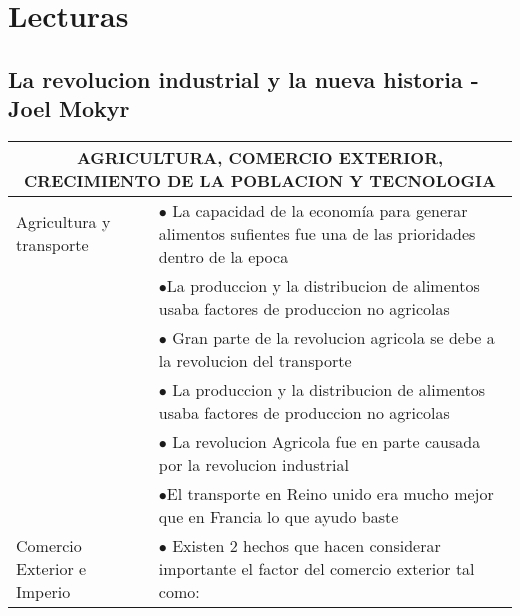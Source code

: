 \section{Lecturas}
\subsection{La revolucion industrial y la nueva historia - Joel Mokyr}

\begingroup
\setlength{\tabcolsep}{12pt} %
\renewcommand{\arraystretch}{1.5} %
\begin{tabular}{p{3cm}|p{12cm}}
  \multicolumn{2}{c}{AGRICULTURA, COMERCIO EXTERIOR, CRECIMIENTO DE LA POBLACION Y TECNOLOGIA}                                                                                                      \\ \hline
  Agricultura y transporte     & $\bullet$ La capacidad de la economía para generar alimentos sufientes fue una de las prioridades dentro de la epoca                                                      \\
                               & $\bullet$La produccion y la distribucion de alimentos usaba factores de produccion no agricolas                                                                           \\
                               & $\bullet$ Gran parte de la revolucion agricola se debe a la revolucion del transporte                                                                                     \\
                               & $\bullet$ La produccion y la distribucion de alimentos usaba factores de produccion no agricolas                                                                          \\
                               & $\bullet$ La revolucion Agricola fue en parte causada por la revolucion industrial                                                                                        \\
                               & $\bullet$El transporte en Reino unido era mucho mejor que en Francia lo que ayudo baste                                                                                   \\ \hline
  Comercio  Exterior e Imperio & $\bullet$ Existen 2 hechos que hacen considerar importante el factor del comercio exterior tal como:                                                                      \\

\end{tabular}

